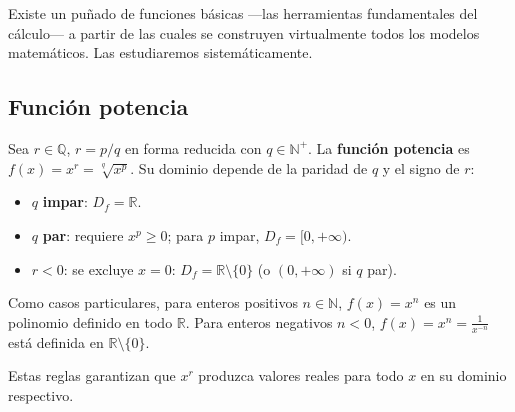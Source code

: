 Existe un puñado de funciones básicas ---las herramientas fundamentales del cálculo--- a partir de las cuales se construyen virtualmente todos los modelos matemáticos. Las estudiaremos sistemáticamente.

\subsection{Función potencia}

\begin{definition}
Sea $r \in \mathbb{Q}$, $r = p/q$ en forma reducida con $q \in \mathbb{N}^+$. La \textbf{función potencia} es $f(x) = x^r = \sqrt[q]{x^p}$. Su dominio depende de la paridad de $q$ y el signo de $r$:
\begin{itemize}
  \item $q$ \textbf{impar}: $D_f = \mathbb{R}$.
  \item $q$ \textbf{par}: requiere $x^p \geq 0$; para $p$ impar, $D_f = [0,+\infty)$.
  \item $r < 0$: se excluye $x = 0$: $D_f = \mathbb{R}\setminus\{0\}$ (o $(0,+\infty)$ si $q$ par).
\end{itemize}
\end{definition}

\begin{rem}
Como casos particulares, para enteros positivos $n \in \mathbb{N}$, $f(x) = x^n$ es un polinomio definido en todo $\mathbb{R}$. Para enteros negativos $n < 0$, $f(x) = x^n = \frac{1}{x^{-n}}$ está definida en $\mathbb{R} \setminus \{0\}$.

Estas reglas garantizan que $x^r$ produzca valores reales para todo $x$ en su dominio respectivo.
\end{rem}

